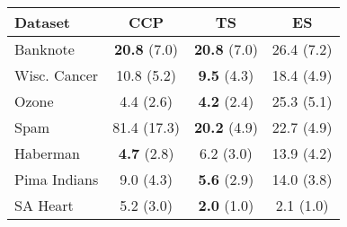 \begin{tabular}{lccc}
\toprule
Dataset & CCP & TS & ES \\
\midrule
Banknote & \textbf{20.8} (7.0) & \textbf{20.8} (7.0) & 26.4 (7.2) \\
Wisc. Cancer & 10.8 (5.2) & \textbf{9.5} (4.3) & 18.4 (4.9) \\
Ozone & 4.4 (2.6) & \textbf{4.2} (2.4) & 25.3 (5.1) \\
Spam & 81.4 (17.3) & \textbf{20.2} (4.9) & 22.7 (4.9) \\
Haberman & \textbf{4.7} (2.8) & 6.2 (3.0) & 13.9 (4.2) \\
Pima Indians & 9.0 (4.3) & \textbf{5.6} (2.9) & 14.0 (3.8) \\
SA Heart & 5.2 (3.0) & \textbf{2.0} (1.0) & 2.1 (1.0) \\
\bottomrule
\end{tabular}